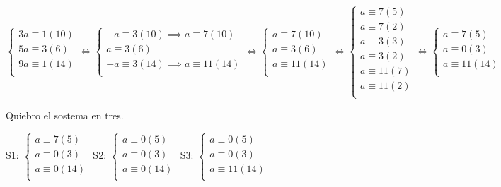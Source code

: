 $ \begin{cases}
    3a \equiv 1(10) \\
    5a \equiv 3(6) \\
    9a \equiv 1(14) \\
\end{cases} 
\iff \begin{cases}
    -a \equiv 3(10) \implies a \equiv 7(10) \\
    a \equiv 3(6) \\
    -a \equiv 3(14) \implies a \equiv 11(14) \\
\end{cases}
\iff \begin{cases}
    a \equiv 7(10) \\
    a \equiv 3(6) \\
    a \equiv 11(14) \\
\end{cases}
\iff \begin{cases}
    a \equiv 7(5) \\
    a \equiv 7(2) \\
    a \equiv 3(3) \\
    a \equiv 3(2) \\
    a \equiv 11(7) \\
    a \equiv 11(2) \\
\end{cases}
\iff \begin{cases}
    a \equiv 7(5) \\
    a \equiv 0(3) \\
    a \equiv 11(14) \\
\end{cases} $

Quiebro el sostema en tres.

S1: $ \begin{cases}
    a \equiv 7(5) \\
    a \equiv 0(3) \\
    a \equiv 0(14) \\
\end{cases} $
S2: $ \begin{cases}
    a \equiv 0(5) \\
    a \equiv 0(3) \\
    a \equiv 0(14) \\
\end{cases} $
S3: $ \begin{cases}
    a \equiv 0(5) \\
    a \equiv 0(3) \\
    a \equiv 11(14) \\
\end{cases} $

